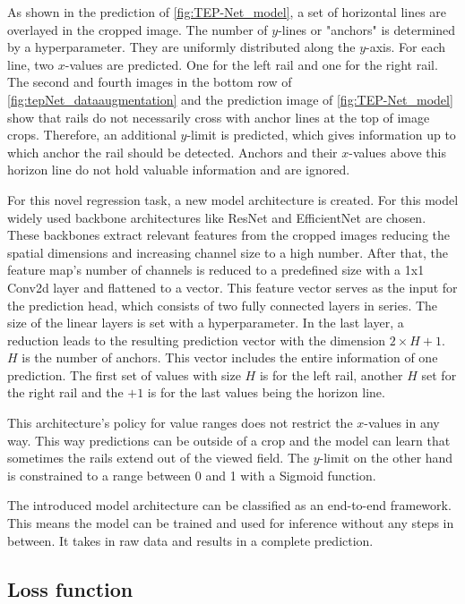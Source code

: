 As shown in the prediction of \autoref{fig:TEP-Net_model}, a set of horizontal lines are overlayed in the cropped image.
The number of $y$-lines or "anchors" is determined by a hyperparameter.
They are uniformly distributed along the $y$-axis. For each line, two $x$-values are predicted.
One for the left rail and one for the right rail.
The second and fourth images in the bottom row of \autoref{fig:tepNet_dataaugmentation} and the prediction image of \autoref{fig:TEP-Net_model} show that rails do not necessarily cross with anchor lines at the top of image crops.
Therefore, an additional $y$-limit is predicted, which gives information up to which anchor the rail should be detected.
Anchors and their $x$-values above this horizon line do not hold valuable information and are ignored.

For this novel regression task, a new model architecture is created.
For this model widely used backbone architectures like ResNet and EfficientNet are chosen.
These backbones extract relevant features from the cropped images reducing the spatial dimensions and increasing channel size to a high number.
After that, the feature map's number of channels is reduced to a predefined size with a 1x1 Conv2d layer \cite{pytorch_conv2d_docu} and flattened to a vector.
This feature vector serves as the input for the prediction head, which consists of two fully connected layers \cite{pytorch_linearLayer_docu} in series.
The size of the linear layers is set with a hyperparameter.
In the last layer, a reduction leads to the resulting prediction vector with the dimension $2 \times H + 1$.
$H$ is the number of anchors.
This vector includes the entire information of one prediction.
The first set of values with size $H$ is for the left rail, another $H$ set for the right rail and the $+ 1$ is for the last values being the horizon line.

This architecture's policy for value ranges does not restrict the $x$-values in any way.
This way predictions can be outside of a crop and the model can learn that sometimes the rails extend out of the viewed field.
The $y$-limit on the other hand is constrained to a range between 0 and 1 with a Sigmoid function.

The introduced model architecture can be classified as an end-to-end framework.
This means the model can be trained and used for inference without any steps in between.
It takes in raw data and results in a complete prediction.

\subsection{Loss function}


